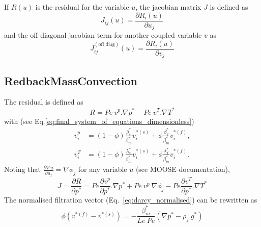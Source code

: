 \documentclass[]{scrreprt}
\newcommand{\moose}{{MOOSE}}
\begin{document}
If $R(u)$ is the residual for the variable $u$, the jacobian matrix $J$ is defined as
\begin{equation}
  \label{eq:def_jacobian}
  J_{ij}(u) = \frac{\partial R_i(u)}{\partial u_j}
\end{equation}
and the off-diagonal jacobian term for another coupled variable $v$ as
\begin{equation}
  \label{eq:def_off_diag_jacobian}
  J^{(\text{off diag})}_{ij}(u) = \frac{\partial R_i(u)}{\partial v_j}
\end{equation}

\subsection{RedbackMassConvection}
The residual is defined as
\begin{equation}
  R = Pe\: v^p.\nabla p^* - Pe\:v^T.\nabla T^*
\end{equation}
with (see Eq.\ref{eq:final_system_of_equations_dimensionless})
\begin{align*}
  v_i^p &= (1-\phi)\frac{\beta^*_s}{\beta^*_m} v_i^{*(s)} + 
    \phi\frac{\beta^*_f}{\beta^*_m}v_i^{*(f)}, \\
  v^T_i &= (1-\phi)\frac{\lambda^*_s}{\beta^*_m} v_i^{*(s)} + 
    \phi\frac{\lambda^*_f}{\beta^*_m} v_i^{*(f)}.
\end{align*}
Noting that $\frac{\partial \nabla u}{\partial u_j}=\nabla \phi_j$ for any variable $u$ (see \moose{} documentation),
\begin{equation}
  \label{eq:def_jac_mass_conv}
  J = \frac{\partial R}{\partial p^*} = Pe \frac{\partial v^p}{\partial p^*}.\nabla p^* + Pe\:v^p\:\nabla \phi_j - Pe\frac{\partial v^T}{\partial p^*}.\nabla T^*
\end{equation}
The normalised filtration vector (Eq.~\ref{eq:darcy_normalised}) can be rewritten as
\begin{equation}
 \label{eq:darcy_normalised2}
  \phi (v^{*(f)} - v^{*(s)}) = -\frac{\beta^*_m}{Le\:Pe} \left(\nabla p^* - \rho_f\:g^* \right)
\end{equation}
\end{document}
